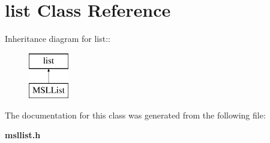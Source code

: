 \section{list  Class Reference}
\label{classlist}
Inheritance diagram for list::\begin{figure}[H]
\begin{center}
\leavevmode
\includegraphics[height=2cm]{classlist}
\end{center}
\end{figure}


The documentation for this class was generated from the following file:\begin{CompactItemize}
\item 
{\bf msllist.h}\end{CompactItemize}
